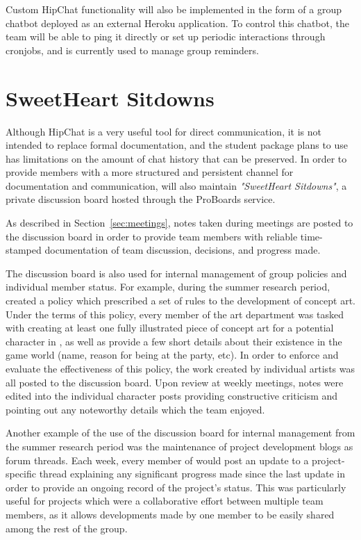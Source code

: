 \documentclass{GlobalDocument}
\begin{document}
Custom HipChat functionality will also be implemented in the form of a group chatbot deployed as an external Heroku application. To control this chatbot, the team will be able to ping it directly or set up periodic interactions through cronjobs, and is currently used to manage group reminders.


\section{SweetHeart Sitdowns}
\label{sec:forum}
Although HipChat is a very useful tool for direct communication, it is not intended to replace formal documentation, and the student package \ourteam{} plans to use has limitations on the amount of chat history that can be preserved. In order to provide members with a more structured and persistent channel for documentation and communication, \ourteam{} will also maintain \textit{"SweetHeart Sitdowns"}, a private discussion board hosted through the ProBoards service.

As described in Section~\ref{sec:meetings}, notes taken during meetings are posted to the discussion board in order to provide team members with reliable time-stamped documentation of team discussion, decisions, and progress made.

The discussion board is also used for internal management of group policies and individual member status. For example, during the summer research period, \ourteam{} created a policy which prescribed a set of rules to the development of concept art. Under the terms of this policy, every member of the art department was tasked with creating at least one fully illustrated piece of concept art for a potential character in \ourgame{}, as well as provide a few short details about their existence in the game world (name, reason for being at the party, etc). In order to enforce and evaluate the effectiveness of this policy, the work created by individual artists was all posted to the discussion board. Upon review at weekly meetings, notes were edited into the individual character posts providing constructive criticism and pointing out any noteworthy details which the team enjoyed.

Another example of the use of the discussion board for internal management from the summer research period was the maintenance of project development blogs as forum threads. Each week, every member of \ourteam{} would post an update to a project-specific thread explaining any significant progress made since the last update in order to provide an ongoing record of the project's status. This was particularly useful for projects which were a collaborative effort between multiple team members, as it allows developments made by one member to be easily shared among the rest of the group.
\end{document}
